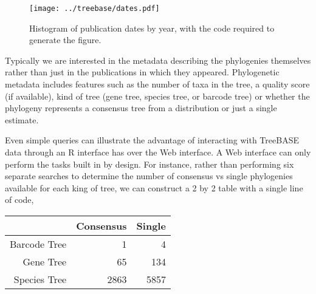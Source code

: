 \begin{Shaded}
\begin{Highlighting}[]
  \NormalTok{(} 
\end{Highlighting}
\end{Shaded}
\begin{figure}[htbp]
\centering
\texttt{[image: ../treebase/dates.pdf]}
\caption{Histogram of publication dates by year, with the code required
to generate the figure.}
\end{figure}

Typically we are interested in the metadata describing the phylogenies
themselves rather than just in the publications in which they appeared.
Phylogenetic metadata includes features such as the number of taxa in
the tree, a quality score (if available), kind of tree (gene tree,
species tree, or barcode tree) or whether the phylogeny represents a
consensus tree from a distribution or just a single estimate.

Even simple queries can illustrate the advantage of interacting with
TreeBASE data through an R interface has over the Web interface. A Web
interface can only perform the tasks built in by design. For instance,
rather than performing six separate searches to determine the number of
consensus vs single phylogenies available for each king of tree, we can
construct a 2 by 2 table with a single line of code,

\begin{Shaded}
\begin{Highlighting}[]
\NormalTok{(meta[[}\NormalTok{]], meta[[}\NormalTok{]])}
\end{Highlighting}
\end{Shaded}
\begin{table}[ht]
\begin{center}
\begin{tabular}{rrr}
  \hline
 & Consensus & Single \\ 
  \hline
Barcode Tree &   1 &   4 \\ 
  Gene Tree &  65 & 134 \\ 
  Species Tree & 2863 & 5857 \\ 
   \hline
\end{tabular}
\end{center}
\end{table}

